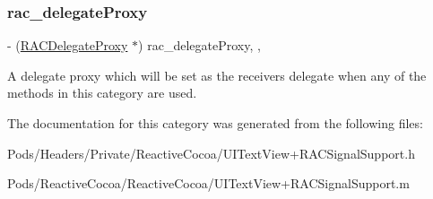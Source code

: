 \subsubsection{\texorpdfstring{rac\+\_\+delegate\+Proxy}{rac\_delegateProxy}}
{\footnotesize\ttfamily -\/ (\mbox{\hyperlink{interface_r_a_c_delegate_proxy}{R\+A\+C\+Delegate\+Proxy}} $\ast$) rac\+\_\+delegate\+Proxy\hspace{0.3cm}{\ttfamily [read]}, {\ttfamily [nonatomic]}, {\ttfamily [strong]}}

A delegate proxy which will be set as the receiver\textquotesingle{}s delegate when any of the methods in this category are used. 

The documentation for this category was generated from the following files\+:\begin{DoxyCompactItemize}
\item 
Pods/\+Headers/\+Private/\+Reactive\+Cocoa/U\+I\+Text\+View+\+R\+A\+C\+Signal\+Support.\+h\item 
Pods/\+Reactive\+Cocoa/\+Reactive\+Cocoa/U\+I\+Text\+View+\+R\+A\+C\+Signal\+Support.\+m\end{DoxyCompactItemize}
